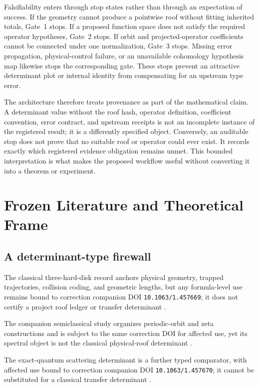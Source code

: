 \documentclass[11pt,a4paper]{article}
\begin{document}
Falsifiability enters through stop states rather than through an expectation of success. If the geometry cannot produce a pointwise roof without fitting inherited totals, Gate~1 stops. If a proposed function space does not satisfy the required operator hypotheses, Gate~2 stops. If orbit and projected-operator coefficients cannot be connected under one normalization, Gate~3 stops. Missing error propagation, physical-control failure, or an unavailable cohomology hypothesis map likewise stops the corresponding gate. These stops prevent an attractive determinant plot or internal identity from compensating for an upstream type error.

The architecture therefore treats provenance as part of the mathematical claim. A determinant value without the roof hash, operator definition, coefficient convention, error contract, and upstream receipts is not an incomplete instance of the registered result; it is a differently specified object. Conversely, an auditable stop does not prove that no suitable roof or operator could ever exist. It records exactly which registered evidence obligation remains unmet. This bounded interpretation is what makes the proposed workflow useful without converting it into a theorem or experiment.

\section{Frozen Literature and Theoretical Frame}

\subsection{A determinant-type firewall}

The classical three-hard-disk record anchors physical geometry, trapped trajectories, collision coding, and geometric lengths, but any formula-level use remains bound to correction companion DOI \texttt{10.1063/1.457669}; it does not certify a project roof ledger or transfer determinant
\citep{P30-S01}.

The companion semiclassical study organizes periodic-orbit and zeta constructions and is subject to the same correction DOI for affected use, yet its spectral object is not the classical physical-roof determinant
\citep{P30-S02}.

The exact-quantum scattering determinant is a further typed comparator, with affected use bound to correction companion DOI \texttt{10.1063/1.457670}; it cannot be substituted for a classical transfer determinant
\citep{P30-S03}.
\end{document}
